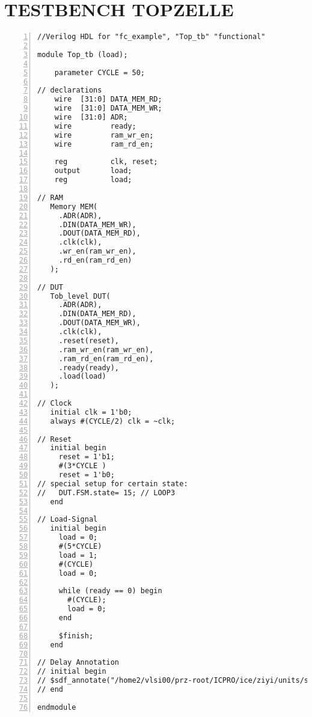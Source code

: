 \section{TESTBENCH TOPZELLE}
\begin{lstlisting}[numbers=left,xleftmargin=1em, multicols=2,frame=leftline, basicstyle = \small\ttfamily]
//Verilog HDL for "fc_example", "Top_tb" "functional"

module Top_tb (load);
    
    parameter CYCLE = 50;
    
// declarations
    wire  [31:0] DATA_MEM_RD;
    wire  [31:0] DATA_MEM_WR;
    wire  [31:0] ADR;
    wire         ready;
    wire         ram_wr_en;
    wire         ram_rd_en;
    
    reg          clk, reset;
    output       load;
    reg          load;
    
// RAM
   Memory MEM(
     .ADR(ADR),
     .DIN(DATA_MEM_WR),
     .DOUT(DATA_MEM_RD),
     .clk(clk),
     .wr_en(ram_wr_en),
     .rd_en(ram_rd_en)
   );
    
// DUT
   Tob_level DUT(
     .ADR(ADR),
     .DIN(DATA_MEM_RD),
     .DOUT(DATA_MEM_WR),
     .clk(clk),
     .reset(reset),
     .ram_wr_en(ram_wr_en),
     .ram_rd_en(ram_rd_en),
     .ready(ready),
     .load(load)
   );
    
// Clock
   initial clk = 1'b0;
   always #(CYCLE/2) clk = ~clk;
    
// Reset
   initial begin
     reset = 1'b1;
     #(3*CYCLE )
     reset = 1'b0;
// special setup for certain state:
// 	 DUT.FSM.state= 15; // LOOP3
   end 
    
// Load-Signal   
   initial begin
     load = 0;
     #(5*CYCLE)
     load = 1;
     #(CYCLE)
     load = 0;
         
     while (ready == 0) begin
       #(CYCLE);
       load = 0;
     end
         
     $finish;
   end
    
// Delay Annotation
// initial begin
// $sdf_annotate("/home2/vlsi00/prz-root/ICPRO/ice/ziyi/units/sdf/ALU_FIXED32.sdf",DUT.Datenpfad.ALU,,);
// end
    
endmodule
\end{lstlisting}
\cleardoublepage

